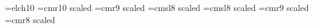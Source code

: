 %
%
%
%


\font\chessfont=elch10
%
\font\numberfont=cmr10 scaled 
\font\authorfont=cmr9 scaled 
\font\origfont=cmsl8 scaled 
\font\dedicfont=cmsl8 scaled 
\font\stipfont=cmr9 scaled 
\font\remfont=cmr8 scaled 

%
\newcount\boardnumber{}%
\newcount\solnumber{}%
\newcount\whitecnt
\newcount\blackcnt
\newcount\neutrcnt

